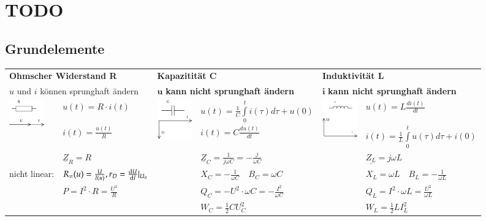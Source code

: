 \section{TODO}
  	\subsection{Grundelemente}
  	\begin{tabular}{p{1.5cm} p{4.3cm} |p{1.5cm} p{4.3cm}| p{1.5cm} p{4.3cm}}
  		\multicolumn{2}{l}{\textbf{Ohmscher Widerstand R}}
  		& \multicolumn{2}{l}{\textbf{Kapazitität C}}
  		& \multicolumn{2}{l}{\textbf{Induktivität L}} \\
  		\multicolumn{2}{l}{$u$ und $i$ können sprunghaft ändern}
  		& \multicolumn{2}{l}{$\mathbf{u}$ \textbf{kann nicht sprunghaft ändern}}
  		& \multicolumn{2}{l}{$\mathbf{i}$ \textbf{kann nicht sprunghaft ändern}} \\
  		
  		\multirow{2}{1.5cm}{
  			\includegraphics[width=1.5cm]{./images/zeigerdiag-r.png}}
  		& $u(t) = R \cdot i(t)$ 
  		& \multirow{2}{1.5cm}{\includegraphics[width=1.5cm]{./images/zeigerdiag-c.png}}
  		& $u(t) = \frac{1}{C} \int\limits_0^t i(\tau) d\tau + u(0)$
  		& 
  		\multirow{2}{1.5cm}{\includegraphics[width=1.5cm]{./images/zeigerdiag-l.png}}
  		&$u(t) = L \frac{di(t)}{dt}$\\
  		
  		&$i(t) = \frac{u(t)}{R}$
  		& & $i(t) = C \frac{d u(t)}{dt}$
  		& & $i(t) = \frac{1}{L} \int\limits_0^t u(\tau) d\tau + i(0)$\\
  		
  		& $\underline{Z}_R = R$
  		& & $\underline{Z}_C = \frac{1}{j \omega C} = - \frac{j}{\omega C}$
  		& & $\underline{Z_L} = j \omega L$\\
  		
  		\parbox{1.7cm}{\small{nicht linear:}}
  		& $R_=(u) = \frac{U}{I(u)}, r_D = \frac{\mathop{}\!\mathrm{d} U}{\mathop{}\!\mathrm{d} I}\lvert_{U_0}$
  		& & $X_C = -\frac{1}{\omega C} \quad B_C = \omega C$
  		& & $X_L = \omega L
  		\quad B_L = -\frac{1}{\omega L}$ \\
  		
  		& $P=I^2 \cdot R = \frac{U^2}{R}$
  		& & $Q_C= - U^2 \cdot \omega C = - \frac{I^2}{\omega C}$
  		& & $Q_L= I^2 \cdot \omega L = \frac{U^2}{\omega L}$\\
  		
  		& & & $W_C=\frac12 C U_C^2$
  		& &$W_L=\frac12 L I_L^2$
  	\end{tabular}

